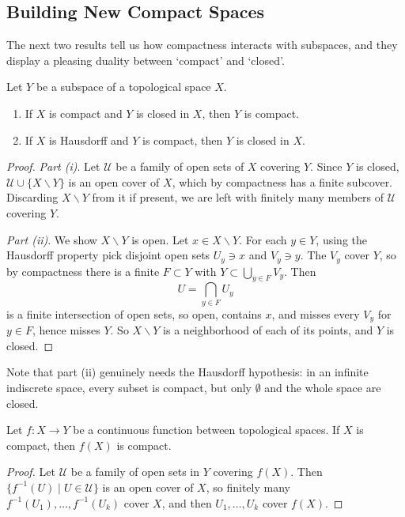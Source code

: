 \documentclass[a4paper]{scrartcl}
\begin{document}
\subsection{Building New Compact Spaces}

The next two results tell us how compactness interacts with subspaces, and they display a pleasing duality between `compact' and `closed'.

\begin{theorem}\label{thm:compactclosed}
    Let $Y$ be a subspace of a topological space $X$.
    \begin{enumerate}[label=(\roman*)]
        \item If $X$ is compact and $Y$ is closed in $X$, then $Y$ is compact.
        \item If $X$ is Hausdorff and $Y$ is compact, then $Y$ is closed in $X$.
    \end{enumerate}
\end{theorem}
\begin{proof}
    \emph{Part (i)}. Let $\mathcal{U}$ be a family of open sets of $X$ covering $Y$. Since $Y$ is closed, $\mathcal{U} \cup \{X \backslash Y\}$ is an open cover of $X$, which by compactness has a finite subcover. Discarding $X \backslash Y$ from it if present, we are left with finitely many members of $\mathcal{U}$ covering $Y$.

    \emph{Part (ii)}. We show $X \backslash Y$ is open. Let $x \in X \backslash Y$. For each $y \in Y$, using the Hausdorff property pick disjoint open sets $U_y \ni x$ and $V_y \ni y$. The $V_y$ cover $Y$, so by compactness there is a finite $F \subset Y$ with $Y \subset \bigcup_{y \in F} V_y$. Then
    $$
    U = \bigcap_{y \in F} U_y
    $$
    is a finite intersection of open sets, so open, contains $x$, and misses every $V_y$ for $y \in F$, hence misses $Y$. So $X \backslash Y$ is a neighborhood of each of its points, and $Y$ is closed.
\end{proof}

Note that part (ii) genuinely needs the Hausdorff hypothesis: in an infinite indiscrete space, every subset is compact, but only $\emptyset$ and the whole space are closed.

\begin{theorem}\label{thm:ctsimage}
    Let $f: X \rightarrow Y$ be a continuous function between topological spaces. If $X$ is compact, then $f(X)$ is compact.
\end{theorem}
\begin{proof}
    Let $\mathcal{U}$ be a family of open sets in $Y$ covering $f(X)$. Then $\{f^{-1}(U) \mid U \in \mathcal{U}\}$ is an open cover of $X$, so finitely many $f^{-1}(U_1), \dots, f^{-1}(U_k)$ cover $X$, and then $U_1, \dots, U_k$ cover $f(X)$.
\end{proof}
\end{document}
